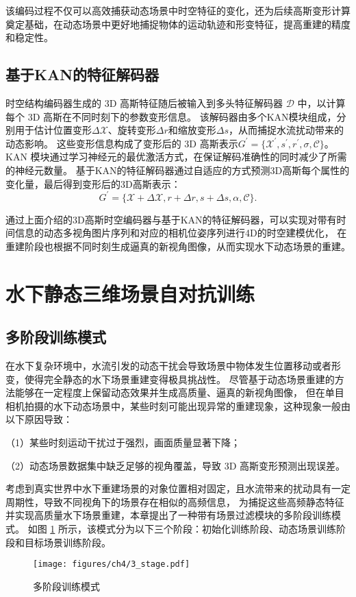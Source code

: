 该编码过程不仅可以高效捕获动态场景中时空特征的变化，还为后续高斯变形计算奠定基础，在动态场景中更好地捕捉物体的运动轨迹和形变特征，提高重建的精度和稳定性。

\subsection{基于KAN的特征解码器}
时空结构编码器生成的 3D 高斯特征随后被输入到多头特征解码器 $\mathcal{D}$ 中，以计算每个 3D 高斯在不同时刻下的参数变形信息。
该解码器由多个KAN模块组成，分别用于估计位置变形$\Delta \mathcal{X}$、旋转变形$\Delta r$和缩放变形$\Delta s$，从而捕捉水流扰动带来的动态影响。
这些变形信息构成了变形后的 3D 高斯表示$G^\prime=\{\mathcal{X}^\prime, s^\prime, r^\prime, \sigma, \mathcal{C} \}$。
KAN 模块通过学习神经元的最优激活方式，在保证解码准确性的同时减少了所需的神经元数量。
基于KAN的特征解码器通过自适应的方式预测3D高斯每个属性的变化量，最后得到变形后的3D高斯表示：
\begin{equation}
    G^\prime = \{ \mathcal{X} + \Delta \mathcal{X}, r + \Delta r, s + \Delta s, \alpha,\mathcal{C} \}.
\end{equation}

通过上面介绍的3D高斯时空编码器与基于KAN的特征解码器，可以实现对带有时间信息的动态多视角图片序列和对应的相机位姿序列进行4D的时空建模优化，
在重建阶段也根据不同时刻生成逼真的新视角图像，从而实现水下动态场景的重建。

\section{水下静态三维场景自对抗训练}
\subsection{多阶段训练模式}
在水下复杂环境中，水流引发的动态干扰会导致场景中物体发生位置移动或者形变，使得完全静态的水下场景重建变得极具挑战性。
尽管基于动态场景重建的方法能够在一定程度上保留动态效果并生成高质量、逼真的新视角图像，
但在单目相机拍摄的水下动态场景中，某些时刻可能出现异常的重建现象，这种现象一般由以下原因导致：

（1）某些时刻运动干扰过于强烈，画面质量显著下降；

（2）动态场景数据集中缺乏足够的视角覆盖，导致 3D 高斯变形预测出现误差。

考虑到真实世界中水下重建场景的对象位置相对固定，且水流带来的扰动具有一定周期性，导致不同视角下的场景存在相似的高频信息，
为捕捉这些高频静态特征并实现高质量水下场景重建，本章提出了一种带有场景过滤模块的多阶段训练模式。
如图 \ref{img:3_stage} 所示，该模式分为以下三个阶段：初始化训练阶段、动态场景训练阶段和目标场景训练阶段。
\begin{figure}[htbp]
    \centering
    \texttt{[image: figures/ch4/3\_stage.pdf]}
    \caption{多阶段训练模式}
    \label{img:3_stage}
\end{figure}

